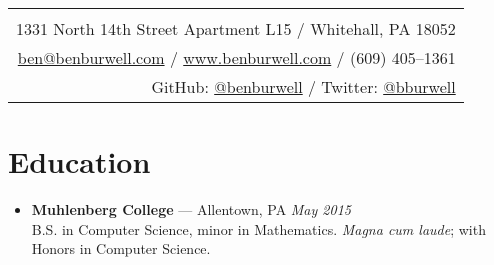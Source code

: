 \documentclass[11pt]{article}
\begin{document}
\thispagestyle{empty}

\noindent\begin{tabularx}{\textwidth}{|N|}
   \\
  1331 North 14th Street Apartment L15 / Whitehall, PA 18052 \\
  \href{mailto:ben@benburwell.com}{ben@benburwell.com} / \href{https://www.benburwell.com/}{www.benburwell.com} / (609) 405--1361 \\
  GitHub: \href{https://github.com/benburwell}{@benburwell} / Twitter: \href{https://twitter.com/bburwell}{@bburwell} \\
  \hline
\end{tabularx}



\section*{Education}
\begin{itemize}
  \item \textbf{Muhlenberg College} --- Allentown, PA \hfill {\em May 2015} \\
    B.S. in Computer Science, minor in Mathematics. {\em Magna cum laude}; with Honors in Computer Science.
\end{itemize}
\end{document}
